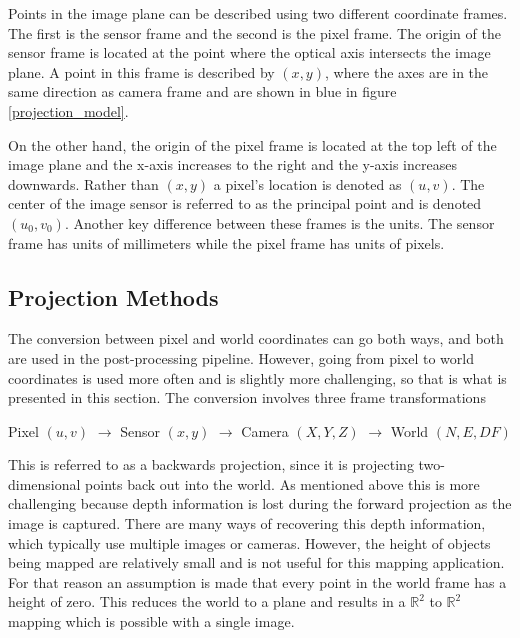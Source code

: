  Points in the image plane can be described using two different coordinate frames.  The first is the sensor frame and the second is the pixel frame.  The origin of the sensor frame is located at the point where the optical axis intersects the image plane.  A point in this frame is described by $(x,y)$, where the axes are in the same direction as camera frame and are shown in blue in figure \ref{projection_model}.  
 
 On the other hand, the origin of the pixel frame is located at the top left of the image plane and the x-axis increases to the right and the y-axis increases downwards.  Rather than $(x,y)$ a pixel's location is denoted as $(u,v)$.  The center of the image sensor is referred to as the principal point and is denoted $(u_0,v_0)$. Another key difference between these frames is the units.  The sensor frame has units of millimeters while the pixel frame has units of pixels.

 \subsection{Projection Methods}

 The conversion between pixel and world coordinates can go both ways, and both are used in the post-processing pipeline.  However, going from pixel to world coordinates is used more often and is slightly more challenging, so that is what is presented in this section. The conversion involves three frame transformations   
\begin{center}
 Pixel $(u,v)$ $\rightarrow$ Sensor $(x,y)$ $\rightarrow$ Camera $(X,Y,Z)$ $\rightarrow$ World $(N,E,DF)$
\end{center}
 
 This is referred to as a backwards projection, since it is projecting two-dimensional points back out into the world.  As mentioned above this is more challenging because depth information is lost during the forward projection as the image is captured.  There are many ways of recovering this depth information, which typically use multiple images or cameras.  However, the height of objects being mapped are relatively small and is not useful for this mapping application.  For that reason an assumption is made that every point in the world frame has a height of zero.  This reduces the world to a plane and results in a $\mathbb{R}^2$ to $\mathbb{R}^2$ mapping which is possible with a single image. 
 
